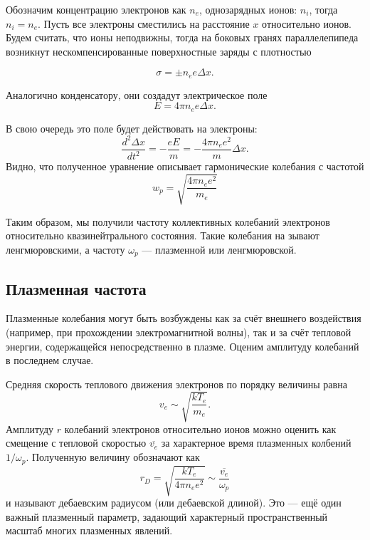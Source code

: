 \documentclass[a4paper]{article}
\begin{document}
Обозначим концентрацию электронов как $n_e$, однозарядных ионов: $n_i$, тогда $n_i=n_e$.
Пусть все электроны сместились на расстояние $x$ относительно ионов.
Будем считать, что ионы неподвижны,
тогда на боковых гранях параллелепипеда возникнут нескомпенсированные поверхностные заряды с плотностью

\begin{equation}
    \sigma = \pm n_e e \Delta x.
\end{equation}

Аналогично конденсатору, они создадут электрическое поле
\begin{equation}
    E = 4 \pi n_e e \Delta x.
\end{equation}

В свою очередь это поле будет действовать на электроны:
\begin{equation}
    \frac{d^2 \Delta x}{dt^2} = - \frac{eE}{m} = - \frac{4 \pi n_e e^2}{m} \Delta x.
\end{equation}
Видно, что полученное уравнение описывает гармонические колебания с частотой
\begin{equation}
    w_p = \sqrt{\frac{4 \pi n_e e^2}{m_e}}
\end{equation}

Таким образом, мы получили частоту коллективных колебаний электронов относительно квазинейтрального состояния. Такие колебания на­
зывают ленгмюровскими, а частоту $\omega_p$ — плазменной или ленгмюровской.

\subsection{Плазменная частота}
Плазменные колебания могут быть возбуждены как за счёт внешнего воздействия
(например, при прохождении электромагнитной волны),
так и за счёт тепловой энергии, содержащейся непосредственно в плазме.
Оценим амплитуду колебаний в последнем случае.

Средняя скорость теплового движения электронов по порядку величины равна
\begin{equation}
    v_e \sim \sqrt{\frac{kT_e}{m_e}}.
\end{equation}
Амплитуду $r$ колебаний электронов относительно ионов можно оценить как
смещение с тепловой скоростью $\overline{v_e}$ за характерное время плазменных колбений 
$1/\omega_p$. Полученную величину обозначают как 
\begin{equation}
    r_D = \sqrt{\frac{kT_e}{4 \pi n_e e^2}} \sim \frac{\overline{v_e}}{\omega_p}
\end{equation}
и называют дебаевским радиусом (или дебаевской длиной).
Это — ещё один важный плазменный параметр, задающий характерный
пространственный масштаб многих плазменных явлений.
\end{document}
